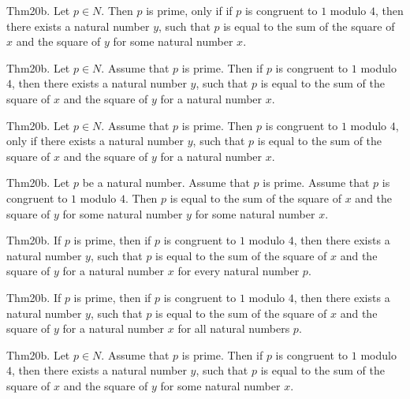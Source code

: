 \documentclass{article}
\begin{document}
Thm20b. Let $p \in N$. Then $p$ is prime, only if if $p$ is congruent to $1$ modulo $4$, then there exists a natural number $y$, such that $p$ is equal to the sum of the square of $x$ and the square of $y$ for some natural number $x$.

Thm20b. Let $p \in N$. Assume that $p$ is prime. Then if $p$ is congruent to $1$ modulo $4$, then there exists a natural number $y$, such that $p$ is equal to the sum of the square of $x$ and the square of $y$ for a natural number $x$.

Thm20b. Let $p \in N$. Assume that $p$ is prime. Then $p$ is congruent to $1$ modulo $4$, only if there exists a natural number $y$, such that $p$ is equal to the sum of the square of $x$ and the square of $y$ for a natural number $x$.

Thm20b. Let $p$ be a natural number. Assume that $p$ is prime. Assume that $p$ is congruent to $1$ modulo $4$. Then $p$ is equal to the sum of the square of $x$ and the square of $y$ for some natural number $y$ for some natural number $x$.

Thm20b. If $p$ is prime, then if $p$ is congruent to $1$ modulo $4$, then there exists a natural number $y$, such that $p$ is equal to the sum of the square of $x$ and the square of $y$ for a natural number $x$ for every natural number $p$.

Thm20b. If $p$ is prime, then if $p$ is congruent to $1$ modulo $4$, then there exists a natural number $y$, such that $p$ is equal to the sum of the square of $x$ and the square of $y$ for a natural number $x$ for all natural numbers $p$.

Thm20b. Let $p \in N$. Assume that $p$ is prime. Then if $p$ is congruent to $1$ modulo $4$, then there exists a natural number $y$, such that $p$ is equal to the sum of the square of $x$ and the square of $y$ for some natural number $x$.
\end{document}
